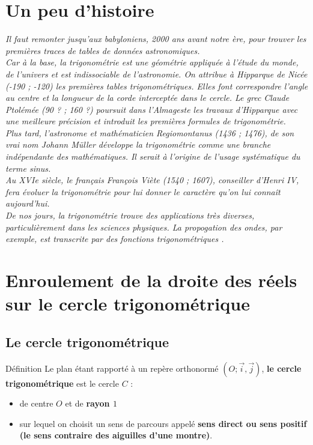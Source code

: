 \documentclass[10pt,a4paper]{article}
\theoremstyle{break}
\begin{document}
	
	\vspace*{1cm}
	
	\begin{center}
		\shadowbox{\begin{large}
				\textcolor{black}{TRIGONOMÉTRIE}
			\end{large}}
		\end{center}
	\tableofcontents
		\section{Un peu d'histoire}
		\textit{Il faut remonter jusqu’aux babyloniens, 2000 ans avant notre ère, pour trouver les premières traces de tables de données astronomiques. \\
			Car à la base, la trigonométrie est une géométrie appliquée à l’étude du monde, de l’univers et est indissociable de l’astronomie. On attribue à Hipparque de Nicée (-190 ; -120) les premières tables trigonométriques. Elles font correspondre l’angle au centre et la longueur de la corde interceptée dans le cercle. Le grec Claude Ptolémée (90 ? ; 160 ?) poursuit dans l’Almageste les travaux d’Hipparque avec une meilleure précision et introduit les premières formules de trigonométrie.\\
			 Plus tard, l’astronome et mathématicien Regiomontanus (1436 ; 1476), de son vrai nom Johann Müller développe la trigonométrie comme une branche indépendante des mathématiques. Il serait à l’origine de l’usage systématique du terme sinus.\\
			  Au XVIe siècle, le français François Viète (1540 ; 1607), conseiller d’Henri IV, fera évoluer la trigonométrie pour lui donner le caractère qu’on lui connaît aujourd’hui.\\
			   De nos jours, la trigonométrie trouve des applications très diverses, particulièrement dans les sciences physiques. La propogation des ondes, par exemple, est transcrite par des fonctions trigonométriques .}
		\section{Enroulement de la droite des réels sur le cercle trigonométrique}
		\subsection{Le cercle trigonométrique}
		
		\begin{bclogo}[couleur = yellow!30, arrondi = 0.1,logo=\bcbook]{Définition}
				Le plan étant rapporté à un repère orthonormé $(O ; \overrightarrow{i}, \overrightarrow{j})$, \textbf{le cercle trigonométrique} est le cercle $C$ :
				\begin{itemize}
					\item de centre $O$ et de \textbf{rayon $1$}
					\item sur lequel on choisit un sens de parcours appelé \textbf{sens direct ou sens positif (le sens contraire des aiguilles d'une montre)}.
				\end{itemize} 
		\end{bclogo}
			
\end{document}
